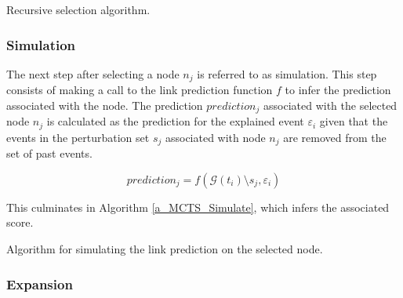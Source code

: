 {
\setlength{\algomargin}{1.25em}
\small
\begin{algorithm}[ht]
\caption{Recursive selection algorithm.}
\label{a_MCTS_Select}
\end{algorithm}
}


\subsubsection{Simulation}
\label{s_Methodology_CoDy_Simulation}
The next step after selecting a node $n_j$ is referred to as simulation. This step consists of making a call to the link prediction function $f$ to infer the prediction associated with the node. The prediction $prediction_j$ associated with the selected node $n_j$ is calculated as the prediction for the explained event $\varepsilon_i$ given that the events in the perturbation set $s_j$ associated with node $n_j$ are removed from the set of past events. 

\begin{equation}
    prediction_j = f(\mathcal{G}(t_i) \setminus s_j, \varepsilon_i)
\end{equation}

This culminates in Algorithm \ref{a_MCTS_Simulate}, which infers the associated score.

{
\setlength{\algomargin}{1.25em}
\small
\begin{algorithm}[ht]
\caption{Algorithm for simulating the link prediction on the selected node.}
\label{a_MCTS_Simulate}
\end{algorithm}
}

\subsubsection{Expansion}
\label{s_Methodology_CoDy_Expansion}

